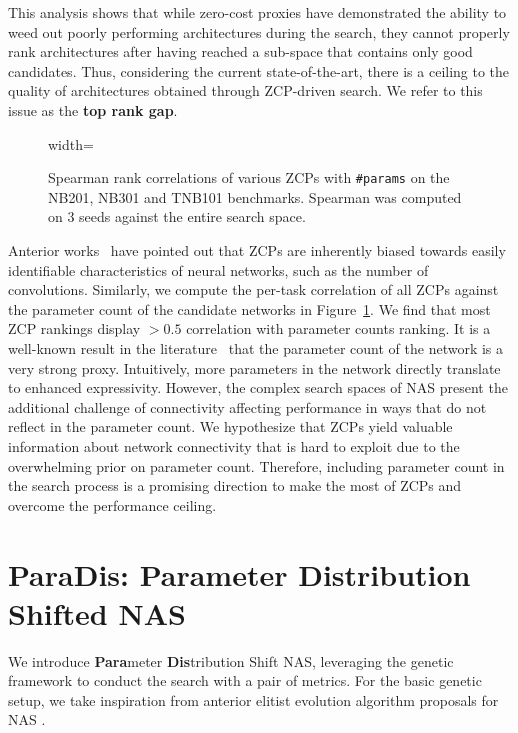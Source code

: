 \documentclass[10pt]{article} %
\begin{document}
This analysis shows that while zero-cost proxies have demonstrated the ability to weed out poorly performing architectures during the search, they cannot properly rank architectures after having reached a sub-space that contains only good candidates. Thus, considering the current state-of-the-art, there is a ceiling to the quality of architectures obtained through ZCP-driven search. We refer to this issue as the \textbf{top rank gap}.

\begin{figure}[t]
\begin{adjustbox}{width=\linewidth}
    
\end{adjustbox}
\caption{\centering Spearman rank correlations of various ZCPs with \texttt{\#params} on the NB201, NB301 and TNB101 benchmarks. Spearman was computed on 3 seeds against the entire search space.}
\label{fig_bench_corr_params}
\end{figure}

Anterior works~\citep{kadlecova2024surprisingly,krishnakumar2022bench} have pointed out that ZCPs are inherently biased towards easily identifiable characteristics of neural networks, such as the number of convolutions. Similarly, we compute the per-task correlation of all ZCPs against the parameter count of the candidate networks in Figure~\ref{fig_bench_corr_params}. We find that most ZCP rankings display $>0.5$ correlation with parameter counts ranking. It is a well-known result in the literature~\citep{colin2022adeeperlook, javaheripi2022litetransformersearch} that the parameter count of the network is a very strong proxy. Intuitively, more parameters in the network directly translate to enhanced expressivity. However, the complex search spaces of NAS present the additional challenge of connectivity affecting performance in ways that do not reflect in the parameter count. We hypothesize that ZCPs yield valuable information about network connectivity that is hard to exploit due to the overwhelming prior on parameter count. Therefore, including parameter count in the search process is a promising direction to make the most of ZCPs and overcome the performance ceiling.

\section{ParaDis: Parameter Distribution Shifted NAS}
\label{method}

We introduce \textbf{Para}meter \textbf{Dis}tribution Shift NAS, leveraging the genetic framework to conduct the search with a pair of metrics. For the basic genetic setup, we take inspiration from anterior elitist evolution algorithm proposals for NAS \citep{real2018regularized, peng2024swap}.
\end{document}
